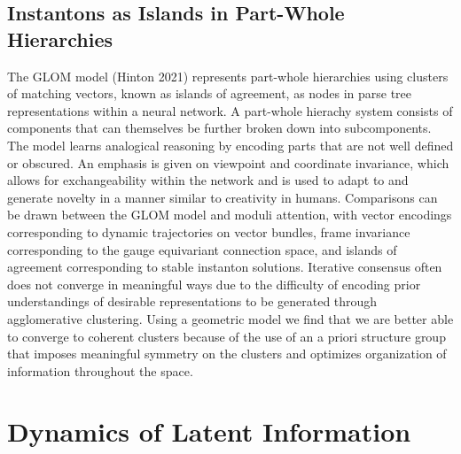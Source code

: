 \documentclass{article}
\begin{document}
    \subsection{Instantons as Islands in Part-Whole Hierarchies}
    The GLOM model (Hinton 2021) represents part-whole hierarchies using clusters of matching vectors, known as islands of agreement, as nodes in parse tree representations within a neural network. A part-whole hierachy system consists of components that can themselves be further broken down into subcomponents. The model learns analogical reasoning by encoding parts that are not well defined or obscured. An emphasis is given on viewpoint and coordinate invariance, which allows for exchangeability within the network and is used to adapt to and generate novelty in a manner similar to creativity in humans. Comparisons can be drawn between the GLOM model and moduli attention, with vector encodings corresponding to dynamic trajectories on vector bundles, frame invariance corresponding to the gauge equivariant connection space, and islands of agreement corresponding to stable instanton solutions. Iterative consensus often does not converge in meaningful ways due to the difficulty of encoding prior understandings of desirable representations to be generated through agglomerative clustering. Using a geometric model we find that we are better able to converge to coherent clusters because of the use of an a priori structure group that imposes meaningful symmetry on the clusters and optimizes organization of information throughout the space. 
    
\section{Dynamics of Latent Information}
\end{document}
